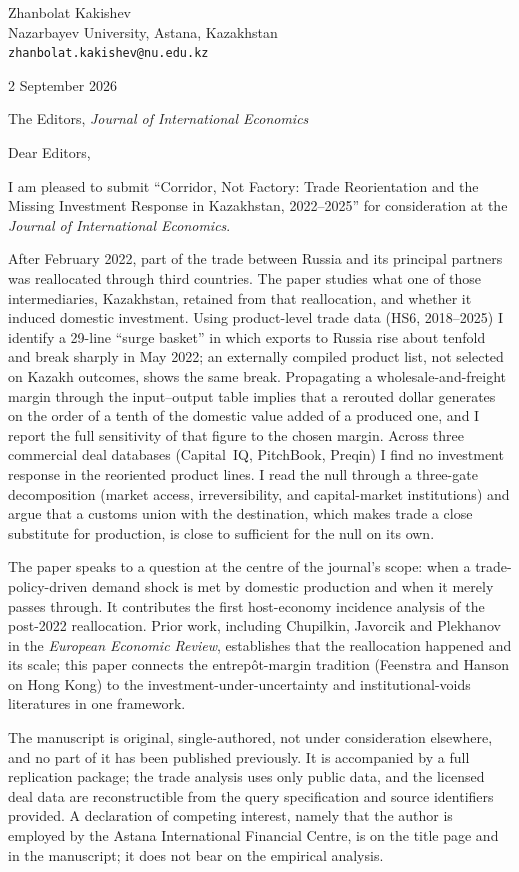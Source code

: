 \documentclass[11pt]{article}
\begin{document}
Zhanbolat Kakishev\\
Nazarbayev University, Astana, Kazakhstan\\
\texttt{zhanbolat.kakishev@nu.edu.kz}

2 September 2026

The Editors, \textit{Journal of International Economics}

Dear Editors,

I am pleased to submit ``Corridor, Not Factory: Trade Reorientation and the Missing Investment
Response in Kazakhstan, 2022--2025'' for consideration at the \textit{Journal of International
Economics}.

After February 2022, part of the trade between Russia and its principal partners was
reallocated through third countries. The paper studies what one of those intermediaries,
Kazakhstan, retained from that reallocation, and whether it induced domestic investment. Using
product-level trade data (HS6, 2018--2025) I identify a 29-line ``surge basket'' in which
exports to Russia rise about tenfold and break sharply in May 2022; an externally compiled
product list, not selected on Kazakh outcomes, shows the same break. Propagating a
wholesale-and-freight margin through the input--output table implies that a rerouted dollar
generates on the order of a tenth of the domestic value added of a produced one, and I report
the full sensitivity of that figure to the chosen margin. Across three commercial deal
databases (Capital~IQ, PitchBook, Preqin) I find no investment response in the reoriented
product lines. I read the null through a three-gate decomposition (market access,
irreversibility, and capital-market institutions) and argue that a customs union with the
destination, which makes trade a close substitute for production, is close to sufficient for
the null on its own.

The paper speaks to a question at the centre of the journal's scope: when a
trade-policy-driven demand shock is met by domestic production and when it merely passes
through. It contributes the first host-economy incidence analysis of the post-2022
reallocation. Prior work, including \mbox{Chupilkin}, Javorcik and Plekhanov in the
\textit{European Economic Review}, establishes that the reallocation happened and its scale;
this paper connects the entrep\^ot-margin tradition (Feenstra and Hanson on Hong Kong)
to the investment-under-uncertainty and institutional-voids literatures in one framework.

The manuscript is original, single-authored, not under consideration elsewhere, and no part of
it has been published previously. It is accompanied by a full replication package; the trade
analysis uses only public data, and the licensed deal data are reconstructible from the query
specification and source identifiers provided. A declaration of competing interest, namely
that the author is employed by the Astana International Financial Centre, is on the title page
and in the manuscript; it does not bear on the empirical analysis.
\end{document}
